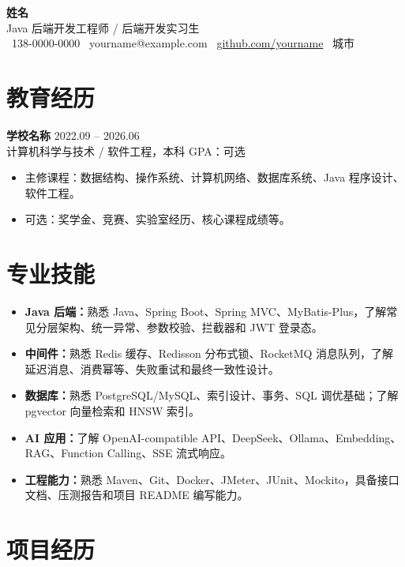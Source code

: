 \documentclass[11pt,a4paper]{ctexart}
\newcommand{\resumeItem}[1]{\item #1}
\newcommand{\resumeSubheading}[4]{
  \textbf{#1} \hfill #2 \\
  {\color{textgray}#3} \hfill {\color{textgray}#4}
}
\begin{document}

\begin{center}
  {\Huge \textbf{姓名}} \\[5pt]
  Java 后端开发工程师 / 后端开发实习生 \\[5pt]
  \faPhone\ 138-0000-0000 \quad
  \faEnvelope\ yourname@example.com \quad
  \faGithub\ \href{https://github.com/yourname}{github.com/yourname} \quad
  \faMapMarker*\ 城市
\end{center}

\section{教育经历}

\resumeSubheading
  {学校名称}{2022.09 -- 2026.06}
  {计算机科学与技术 / 软件工程，本科}{GPA：可选}

\begin{itemize}
  \resumeItem{主修课程：数据结构、操作系统、计算机网络、数据库系统、Java 程序设计、软件工程。}
  \resumeItem{可选：奖学金、竞赛、实验室经历、核心课程成绩等。}
\end{itemize}

\section{专业技能}

\begin{itemize}
  \resumeItem{\textbf{Java 后端：}熟悉 Java、Spring Boot、Spring MVC、MyBatis-Plus，了解常见分层架构、统一异常、参数校验、拦截器和 JWT 登录态。}
  \resumeItem{\textbf{中间件：}熟悉 Redis 缓存、Redisson 分布式锁、RocketMQ 消息队列，了解延迟消息、消费幂等、失败重试和最终一致性设计。}
  \resumeItem{\textbf{数据库：}熟悉 PostgreSQL/MySQL、索引设计、事务、SQL 调优基础；了解 pgvector 向量检索和 HNSW 索引。}
  \resumeItem{\textbf{AI 应用：}了解 OpenAI-compatible API、DeepSeek、Ollama、Embedding、RAG、Function Calling、SSE 流式响应。}
  \resumeItem{\textbf{工程能力：}熟悉 Maven、Git、Docker、JMeter、JUnit、Mockito，具备接口文档、压测报告和项目 README 编写能力。}
\end{itemize}

\section{项目经历}
\end{document}
